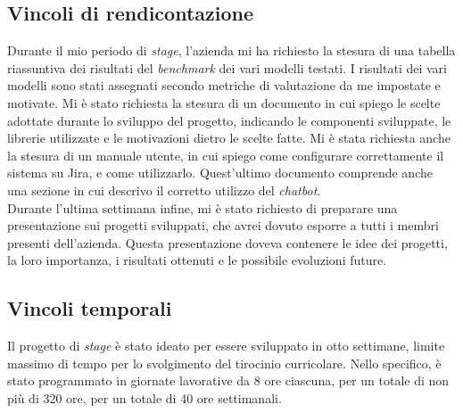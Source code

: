 \subsection{Vincoli di rendicontazione}
Durante il mio periodo di \textit{stage}, l'azienda mi ha richiesto la stesura di una tabella riassuntiva dei risultati del \textit{benchmark} dei vari modelli testati. I risultati dei vari modelli sono stati assegnati secondo metriche di valutazione da me impostate e motivate.
Mi è stato richiesta la stesura di un documento in cui spiego le scelte adottate durante lo sviluppo del progetto, indicando le componenti sviluppate, le librerie utilizzate e le motivazioni dietro le scelte fatte.
Mi è stata richiesta anche la stesura di un manuale utente, in cui spiego come configurare correttamente il sistema su Jira, e come utilizzarlo. Quest'ultimo documento comprende anche una sezione in cui descrivo il corretto utilizzo del \textit{chatbot}.\\
Durante l'ultima settimana infine, mi è stato richiesto di preparare una presentazione sui progetti sviluppati, che avrei dovuto esporre a tutti i membri presenti dell'azienda. Questa presentazione doveva contenere le idee dei progetti, la loro importanza, i risultati ottenuti e le possibile evoluzioni future.
\subsection{Vincoli temporali}
Il progetto di \textit{stage} è stato ideato per essere sviluppato in otto settimane, limite massimo di tempo per lo svolgimento del tirocinio curricolare. Nello specifico, è stato programmato in giornate lavorative da 8 ore ciascuna, per un totale di non più di 320 ore, per un totale di 40 ore settimanali.

